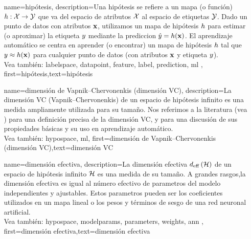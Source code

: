 {name={hipótesis},
	description={Una hipótesis se refiere a un mapa (o función) $h: \mathcal{X} \rightarrow \mathcal{Y}$ que va del
		espacio de atributos $\mathcal{X}$ al espacio de etiquetas $\mathcal{Y}$. 
		Dado un punto de datos con atributos ${\bf x}$, utilizamos un mapa de hipótesis $h$
		para estimar (o aproximar) la etiqueta $y$ mediante la prediccion
		$\hat{y} = h({\bf x})$. El aprendizaje automático se centra en aprender (o encontrar) un mapa de hipótesis 
		$h$ tal que $y \approx h({\bf x})$ 
		para cualquier punto de datos (con atributos ${\bf x}$ y etiqueta $y$).
		\\
		Vea también: \gls{labelspace}, \gls{datapoint}, \gls{feature}, \gls{label}, \gls{prediction}, \Gls{ml}  },
	first={hipótesis},text={hipótesis}  
}



{name={dimensión de Vapnik–Chervonenkis (dimensión VC)},
	description={La dimensión VC (Vapnik–Chervonenkis) de un espacio de hipótesis infinito es una medida ampliamente utilizada para su tamaño.
		Nos referimos a la literatura (vea \cite{ShalevMLBook}) para una definición precisa de la dimensión VC,
		y para una discusión de sus propiedades básicas y su uso en aprendizaje automático.
		\\
		Vea también: \gls{hypospace}, \gls{ml}},
	first={dimensión de Vapnik–Chervonenkis (dimensión VC)},text={dimensión VC}  
}

{name={dimensión efectiva},
	description={La dimensión efectiva $d_{\rm eff} \left( \mathcal{H} \right)$ de un 
		espacio de hipótesis infinito $\mathcal{H}$ es una medida de su tamaño. A grandes rasgos,la 
		dimensión efectiva es igual al número efectivo de parametros del modelo independientes y ajustables. 
		Estos parametros pueden ser los coeficientes utilizados en un mapa lineal o los 
		pesos y términos de sesgo de una red neuronal artificial.
		\\
		Vea también: \gls{hypospace}, \gls{modelparams}, \gls{parameters}, \gls{weights}, \gls{ann} },
	first={dimensión efectiva},text={dimensión efectiva}  
}

